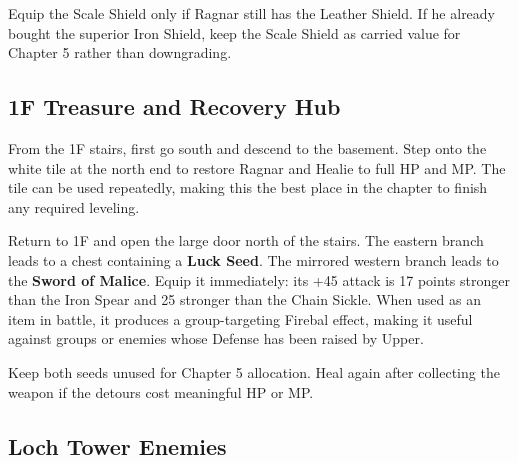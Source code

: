 \documentclass[
  american,
  10pt,
  letterpaper,
  oneside,
  open=any]{scrreprt}
\begin{document}
Equip the Scale Shield only if Ragnar still has the Leather Shield. If
he already bought the superior Iron Shield, keep the Scale Shield as
carried value for Chapter 5 rather than downgrading.

\subsection{1F Treasure and Recovery
Hub}\label{f-treasure-and-recovery-hub}

From the 1F stairs, first go south and descend to the basement. Step
onto the white tile at the north end to restore Ragnar and Healie to
full HP and MP. The tile can be used repeatedly, making this the best
place in the chapter to finish any required leveling.

Return to 1F and open the large door north of the stairs. The eastern
branch leads to a chest containing a \textbf{Luck Seed}. The mirrored
western branch leads to the \textbf{Sword of Malice}. Equip it
immediately: its +45 attack is 17 points stronger than the Iron Spear
and 25 stronger than the Chain Sickle. When used as an item in battle,
it produces a group-targeting Firebal effect, making it useful against
groups or enemies whose Defense has been raised by Upper.

Keep both seeds unused for Chapter 5 allocation. Heal again after
collecting the weapon if the detours cost meaningful HP or MP.

\subsection{Loch Tower Enemies}\label{loch-tower-enemies}
\end{document}
